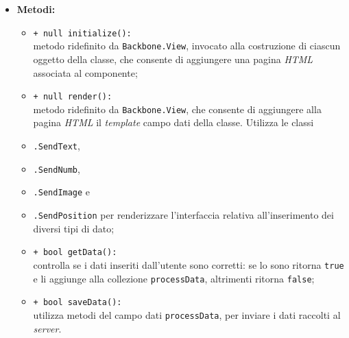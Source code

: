 \begin{flushleft}
\begin{itemize}
\begin{sloppypar}
\begin{itemize}
\end{itemize}
\end{sloppypar}
\item \textbf{Metodi:}
\begin{sloppypar}
\begin{itemize}
\item \texttt{+ null initialize():}\\ metodo ridefinito da \texttt{Backbone.View}, invocato alla costruzione di ciascun oggetto della classe, che consente di aggiungere una pagina \textit{HTML} associata al componente;
\item \texttt{+ null render():}\\ metodo ridefinito da \texttt{Backbone.View}, che consente di aggiungere alla pagina \textit{HTML} il \textit{template} campo dati della classe. Utilizza le classi \item \texttt{\logicUser{}.SendText}, \item \texttt{\logicUser{}.SendNumb}, \item \texttt{\logicUser{}.SendImage} e \item \texttt{\logicUser{}.SendPosition} per renderizzare l'interfaccia relativa all'inserimento dei diversi tipi di dato;
\item \texttt{+ bool getData():}\\ controlla se i dati inseriti dall'utente sono corretti: se lo sono ritorna \texttt{true} e li aggiunge alla collezione \texttt{processData}, altrimenti ritorna \texttt{false};
\item \texttt{+ bool saveData():}\\ utilizza metodi del campo dati \texttt{processData}, per inviare i dati raccolti al \textit{server}.
\end{itemize}
\end{sloppypar}
\end{itemize}
\end{flushleft}

